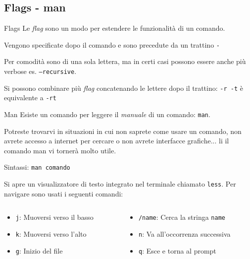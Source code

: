 \subsection{Flags - man}
\begin{frame}{Flags}
  Le \textit{flag} sono un modo per estendere le funzionalità di un 
  comando.\bigskip

  Vengono specificate dopo il comando e sono precedute da un trattino 
  \texttt{-}\bigskip

  Per comodità sono di una sola lettera, ma in certi casi possono essere anche 
  più verbose es. \texttt{--recursive}.\bigskip

  Si possono combinare più \textit{flag} concatenando le lettere dopo il 
  trattino: \texttt{-r -t} è equivalente a \texttt{-rt}
\end{frame}

\begin{frame}{Man}
  Esiste un comando per leggere il \textit{manuale} di un comando: 
  \texttt{man}.\bigskip

  Potreste trovarvi in situazioni in cui non saprete come usare un comando,
  non avrete accesso a internet per cercare o non avrete interfacce grafiche...
  li il comando man vi tornerà molto utile.\bigskip

  Sintassi: \texttt{man comando}\bigskip

  Si apre un visualizzatore di testo integrato nel terminale chiamato \texttt{less}.
  Per navigare sono usati i seguenti comandi:
  \begin{columns}[T] %
    \begin{column}{.5\textwidth} %
      \begin{itemize}
        \item \texttt{j}: Muoversi verso il basso
        \item \texttt{k}: Muoversi verso l'alto
        \item \texttt{g}: Inizio del file
      \end{itemize}
    \end{column}
    \begin{column}{.5\textwidth} %
      \begin{itemize}
        \item \texttt{/name}: Cerca la stringa \texttt{name}
        \item \texttt{n}: Va all'occorrenza successiva
        \item \texttt{q}: Esce e torna al prompt
      \end{itemize}
    \end{column}
  \end{columns}
\end{frame}

